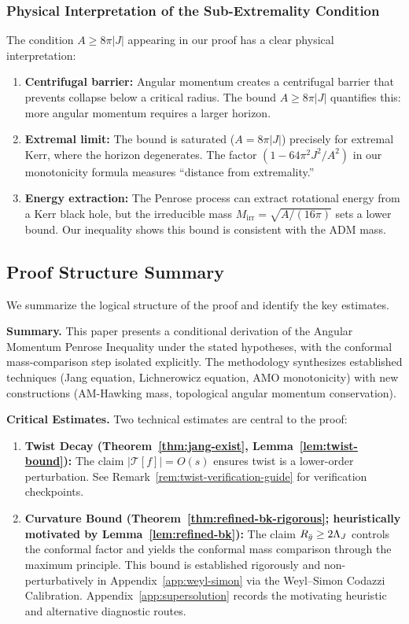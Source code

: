 \subsubsection{Physical Interpretation of the Sub-Extremality Condition}

The condition $A \geq 8\pi|J|$ appearing in our proof has a clear physical interpretation:

\begin{enumerate}
    \item \textbf{Centrifugal barrier:} Angular momentum creates a centrifugal barrier that prevents collapse below a critical radius. The bound $A \geq 8\pi|J|$ quantifies this: more angular momentum requires a larger horizon.
    
    \item \textbf{Extremal limit:} The bound is saturated ($A = 8\pi|J|$) precisely for extremal Kerr, where the horizon degenerates. The factor $(1 - 64\pi^2 J^2/A^2)$ in our monotonicity formula measures ``distance from extremality.''
    
    \item \textbf{Energy extraction:} The Penrose process can extract rotational energy from a Kerr black hole, but the irreducible mass $M_{\text{irr}} = \sqrt{A/(16\pi)}$ sets a lower bound. Our inequality shows this bound is consistent with the ADM mass.
\end{enumerate}

\subsection{Proof Structure Summary}\label{subsec:proof-status}

We summarize the logical structure of the proof and identify the key estimates.

\textbf{Summary.} This paper presents a conditional derivation of the Angular Momentum Penrose Inequality under the stated hypotheses, with the conformal mass-comparison step isolated explicitly. The methodology synthesizes established techniques (Jang equation, Lichnerowicz equation, AMO monotonicity) with new constructions (AM-Hawking mass, topological angular momentum conservation).

\textbf{Critical Estimates.} Two technical estimates are central to the proof:
\begin{enumerate}
    \item \textbf{Twist Decay (Theorem~\ref{thm:jang-exist}, Lemma~\ref{lem:twist-bound}):} The claim $|\mathcal{T}[f]| = O(s)$ ensures twist is a lower-order perturbation. See Remark~\ref{rem:twist-verification-guide} for verification checkpoints.
    \item \textbf{Curvature Bound (Theorem~\ref{thm:refined-bk-rigorous}; heuristically motivated by Lemma~\ref{lem:refined-bk}):} The claim $R_{\bar{g}} \geq 2\Lambda_J$ controls the conformal factor and yields the conformal mass comparison through the maximum principle. This bound is established rigorously and non-perturbatively in Appendix~\ref{app:weyl-simon} via the Weyl--Simon Codazzi Calibration. Appendix~\ref{app:supersolution} records the motivating heuristic and alternative diagnostic routes.
\end{enumerate}

